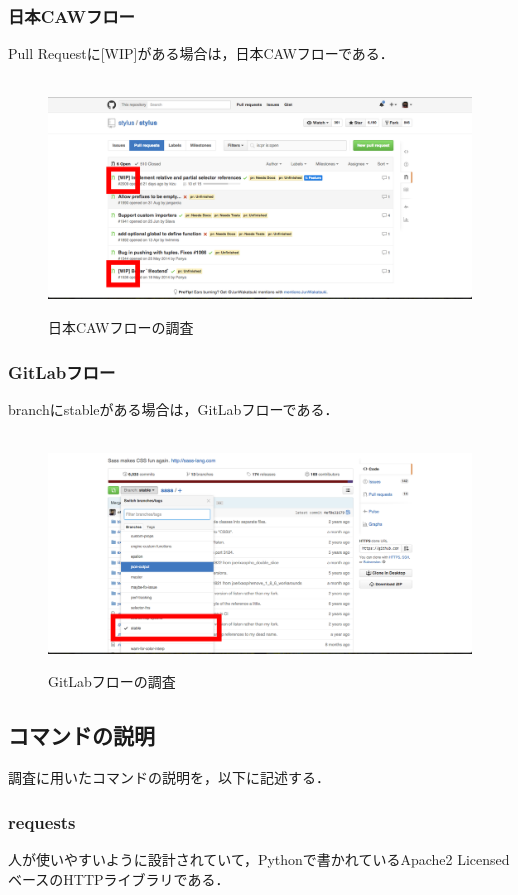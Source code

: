 \subsubsection{日本CAWフロー}
Pull Requestに[WIP]がある場合は，日本CAWフローである．
\begin{figure}[H]
\centering　
\includegraphics[width=13cm]{wipflow.png}
\caption{日本CAWフローの調査}\label{tab:wipフロー}
\end{figure}


\subsubsection{GitLabフロー}
branchにstableがある場合は，GitLabフローである．
\begin{figure}[H]
\centering　
\includegraphics[width=13cm]{GitLabflow.png}
\caption{GitLabフローの調査}\label{tab:GitLabフロー}
\end{figure}


\subsection{コマンドの説明}

調査に用いたコマンドの説明を，以下に記述する．
\subsubsection{requests}
人が使いやすいように設計されていて，Pythonで書かれているApache2 LicensedベースのHTTPライブラリである．
